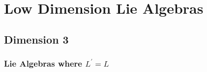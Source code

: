 \documentclass[../main.tex]{subfiles}
\begin{document}
\ifSubfilesClassLoaded{

    
}{}

\chapter{ Low Dimension Lie Algebras }
\section{Dimension 3}

\subsection{Lie Algebras where \(  L^{\prime} = L  \) }
\end{document}
